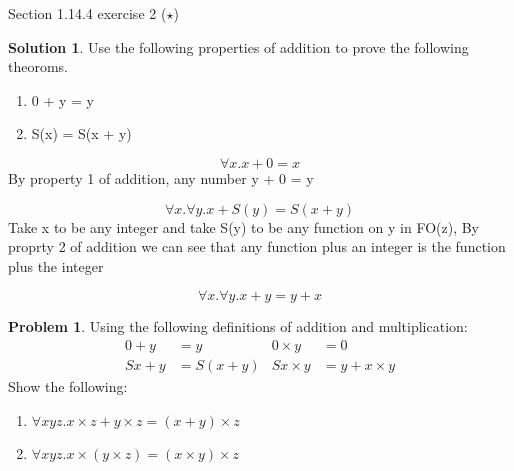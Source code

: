 \documentclass[10pt]{article}
\theoremstyle{definition}
\newtheorem{prob}{Problem}
\newtheorem{sol}{Solution}
\begin{document}
Section 1.14.4 exercise 2 ($\star$)
\begin{sol}
Use the following properties of addition to prove the following theoroms.
	\begin{enumerate}
	\item 0 + y = y  
	\item S(x)  = S(x + y) 
	\end{enumerate}
	
	\begin{equation}
	\forall x. x + 0 = x
	\end{equation}
	By property 1 of addition, any number y + 0 = y
	
	\begin{equation}
	\forall x. \forall y. x + S(y) = S(x+y)
	\end{equation}
	Take x to be any integer and take S(y) to be any function on y in FO(z), By proprty 2 of addition we can see that any function plus an integer is the function plus the integer
	
	\begin{equation}
	\forall x. \forall y. x + y = y + x
	\end{equation}
\end{sol}



\begin{prob}
  Using the following definitions of addition and multiplication:
  \begin{align*}
    0 + y &= y & 0 \times y &= 0 \\
    Sx + y &= S(x + y) & Sx \times y &= y + x \times y
  \end{align*}
  Show the following:
  \begin{enumerate}[label=(\alph*)]
  \item $\forall x y z. x \times z + y \times z = (x + y) \times z$
  \item $\forall x y z. x \times (y \times z) = (x \times y) \times z$
  \end{enumerate}

\end{prob}
\end{document}
